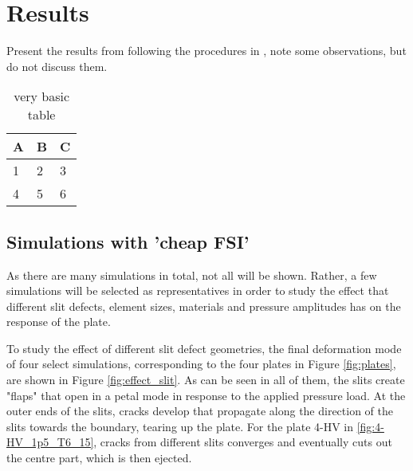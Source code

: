 \chapter{Results}\label{chapter:Results}
Present the results from following the procedures in , note some observations, but do not discuss them.

\begin{table}[h]
    \centering
    \begin{tabular}{l | l | l}
    A & B & C \\
    \hline
    1 & 2 & 3 \\
    4 & 5 & 6
    \end{tabular}
    \caption{very basic table}
    \label{tab:abc}
    \end{table}

\section{Simulations with 'cheap FSI'}
As there are many simulations in total, not all will be shown. Rather, a few simulations will be selected as representatives in order to study the effect that different slit defects, element sizes, materials and pressure amplitudes has on the response of the plate.

To study the effect of different slit defect geometries, the final deformation mode of four select simulations, corresponding to the four plates in Figure \ref{fig:plates}, are shown in Figure \ref{fig:effect_slit}. As can be seen in all of them, the slits create "flaps" that open in a petal mode in response to the applied pressure load. At the outer ends of the slits, cracks develop that propagate along the direction of the slits towards the boundary, tearing up the plate. For the plate 4-HV in \ref{fig:4-HV_1p5_T6_15}, cracks from different slits converges and eventually cuts out the centre part, which is then ejected.

